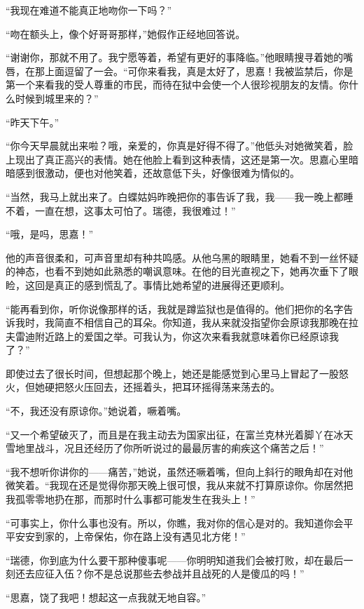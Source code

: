 \par “我现在难道不能真正地吻你一下吗？”
\par “吻在额头上，像个好哥哥那样，”她假作正经地回答说。
\par “谢谢你，那就不用了。我宁愿等着，希望有更好的事降临。”他眼睛搜寻着她的嘴唇，在那上面逗留了一会。“可你来看我，真是太好了，思嘉！我被监禁后，你是第一个来看我的受人尊重的市民，而待在狱中会使一个人很珍视朋友的友情。你什么时候到城里来的？”
\par “昨天下午。”
\par “你今天早晨就出来啦？哦，亲爱的，你真是好得不得了。”他低头对她微笑着，脸上现出了真正高兴的表情。她在他脸上看到这种表情，这还是第一次。思嘉心里暗暗感到很激动，便也对他笑着，还故意低下头，好像很难为情似的。
\par “当然，我马上就出来了。白蝶姑妈昨晚把你的事告诉了我，我——我一晚上都睡不着，一直在想，这事太可怕了。瑞德，我很难过！”
\par “哦，是吗，思嘉！”
\par 他的声音很柔和，可声音里却有种共鸣感。从他乌黑的眼睛里，她看不到一丝怀疑的神态，也看不到她如此熟悉的嘲讽意味。在他的目光直视之下，她再次垂下了眼睑，这回是真正的感到慌乱了。事情比她希望的进展得还更顺利。
\par “能再看到你，听你说像那样的话，我就是蹲监狱也是值得的。他们把你的名字告诉我时，我简直不相信自己的耳朵。你知道，我从来就没指望你会原谅我那晚在拉夫雷迪附近路上的爱国之举。可我认为，你这次来看我就意味着你已经原谅我了？”
\par 即使过去了很长时间，但想起那个晚上，她还是能感觉到心里马上冒起了一股怒火，但她硬把怒火压回去，还摇着头，把耳环摇得荡来荡去的。
\par “不，我还没有原谅你。”她说着，噘着嘴。
\par “又一个希望破灭了，而且是在我主动去为国家出征，在富兰克林光着脚丫在冰天雪地里战斗，况且还经历了你所听说过的最最厉害的痢疾这个痛苦之后！”
\par “我不想听你讲你的——痛苦，”她说，虽然还噘着嘴，但向上斜行的眼角却在对他微笑着。“我现在还是觉得你那天晚上很可恨，我从来就不打算原谅你。你居然把我孤零零地扔在那，而那时什么事都可能发生在我头上！”
\par “可事实上，你什么事也没有。所以，你瞧，我对你的信心是对的。我知道你会平平安安到家的，上帝保佑，你在路上没有遇见北方佬！”
\par “瑞德，你到底为什么要干那种傻事呢——你明明知道我们会被打败，却在最后一刻还去应征入伍？你不是总说那些去参战并且战死的人是傻瓜的吗！”
\par “思嘉，饶了我吧！想起这一点我就无地自容。”
